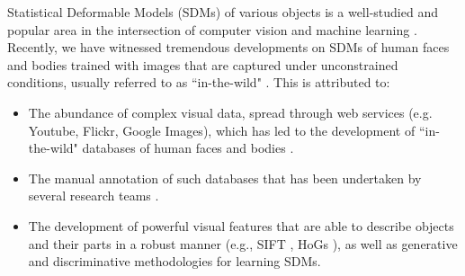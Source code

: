 Statistical Deformable Models (SDMs) of various objects is a well-studied and popular area in the intersection of computer vision and machine learning \cite{Cootes1995, Cootes2001, Matthews2004, Saragih2011, Belhumeur2011, Zhu2012, Xiong2013}. Recently, we have witnessed tremendous developments on SDMs of human faces and bodies trained with images that are captured under unconstrained conditions, usually referred to as ``in-the-wild" \cite{Belhumeur2011, Cao2012, Zhu2012, Xiong2013, Asthana2013, Tzimiropoulos2014, Asthana2014, kazemi2014one, Alabort2014, zhu2015face, antonakos2015feature, antonakos2015active, Joan_cvpr2015, tzimiropoulos2015project}. This is attributed to:
\begin{itemize}
\item The abundance of complex visual data, spread through web services (e.g. Youtube, Flickr, Google Images), which has led to the development of ``in-the-wild" databases of human faces and bodies \cite{Belhumeur2011, Le2012, Zhu2012, Burgos2013}.

\item The manual annotation of such databases that has been undertaken by several research teams \cite{sagonas2016faces,charles2013domain,dantone2014body,andriluka14cvpr}.

\item The development of powerful visual features that are able to describe objects and their parts in a robust manner (e.g., SIFT \cite{lowe1999object}, HoGs \cite{Dalal2005}
), as well as generative and discriminative methodologies for learning SDMs.
\end{itemize}

